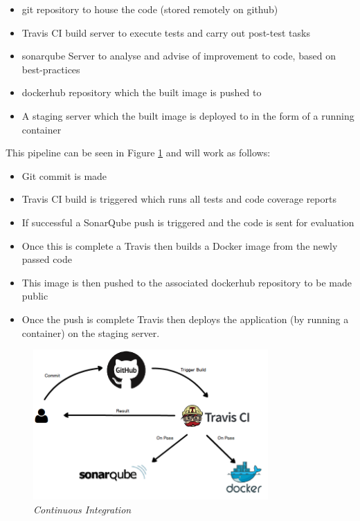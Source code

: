 \begin{itemize}
	\item \gls{git} repository to house the code (stored remotely on \gls{github})
	\item \gls{Travis} CI build server to execute tests and carry out post-test tasks
	\item \gls{sonarqube} Server to analyse and advise of improvement to code, based on best-practices
	\item \gls{dockerhub} repository which the built image is pushed to
	\item A \gls{staging server} which the built image is deployed to in the form of a running container
\end{itemize}

This pipeline can be seen in Figure \ref{fig:CI} and will work as follows:

\begin{itemize}
	\item Git commit is made
	\item Travis CI build is triggered which runs all tests and \gls{code coverage} reports
	\item If successful a SonarQube push is triggered and the code is sent for evaluation
	\item Once this is complete a Travis then builds a \gls{Docker image} from the newly passed code
	\item This image is then pushed to the associated \gls{dockerhub} repository to be made public
	\item Once the push is complete Travis then deploys the application (by running a container) on the \gls{staging server}.
\end{itemize}

\begin{figure}[!ht]
\centering
\includegraphics*[width=0.8\textwidth]{images/CI}
\caption{\em Continuous Integration}
\label{fig:CI}
\end{figure}

